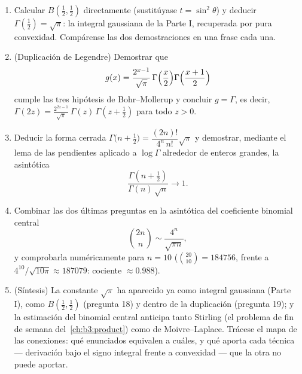\begin{problem}
\begin{enumerate}[resume]
\[        \]
        para concluir la \emph{fórmula de Euler}: $B(x, y) =
        \dfrac{\Gamma(x)\Gamma(y)}{\Gamma(x+y)}$ --- sin ninguna
        integral doble. \item Calcular $B(\frac12, \frac12)$
        directamente (sustitúyase $t
        = \sin^2\theta$) y deducir $\Gamma(\frac12) =
        \sqrt\pi$: la integral gaussiana de la Parte I, recuperada por
        pura convexidad. Compárense las dos demostraciones en una frase
        cada una. \item (Duplicación de Legendre) Demostrar que
        \[
        g(x) = \frac{2^{x-1}}{\sqrt\pi}\,
        \Gamma\Bigl(\frac x2\Bigr)
        \Gamma\Bigl(\frac{x+1}2\Bigr)
        \]
        cumple las tres hipótesis de Bohr--Mollerup y concluir
        $g = \Gamma$, es decir, $\Gamma(2z) =
        \frac{2^{2z-1}}{\sqrt\pi}\,\Gamma(z)\,\Gamma(z +
        \tfrac12)$ para todo $z > 0$. \item Deducir la forma cerrada
        $\Gamma\bigl(n + \tfrac12\bigr)
        = \dfrac{(2n)!}{4^n\,n!}\sqrt\pi$ y demostrar, mediante el lema
        de las pendientes aplicado a $\log\Gamma$ alrededor de enteros
        grandes, la asintótica
        \[
        \frac{\Gamma(n + \frac12)}{\Gamma(n)\,\sqrt n}
        \longrightarrow 1 .
        \]
  \item Combinar las dos últimas preguntas en la asintótica del
  coeficiente binomial central
        \[
        \binom{2n}{n} \sim \frac{4^n}{\sqrt{\pi n}},
        \]
        y comprobarla numéricamente para $n = 10$ ($\binom{20}{10} =
        184756$, frente a $4^{10}/\sqrt{10\pi} \approx
        187079$: cociente $\approx 0.988$). \item (Síntesis) La
        constante $\sqrt\pi$ ha aparecido ya como integral gaussiana
        (Parte I), como $B(\frac12,
        \frac12)$ (pregunta 18) y dentro de la duplicación (pregunta
        19); y la estimación del binomial central anticipa tanto
        Stirling (el problema de fin de semana del~\cref{ch:b3:product})
        como de Moivre--Laplace. Trácese el mapa de las conexiones: qué
        enunciados equivalen a cuáles, y qué aporta cada técnica ---
        derivación bajo el signo integral frente a convexidad --- que la
        otra no puede aportar.
\end{enumerate}


\end{problem}
